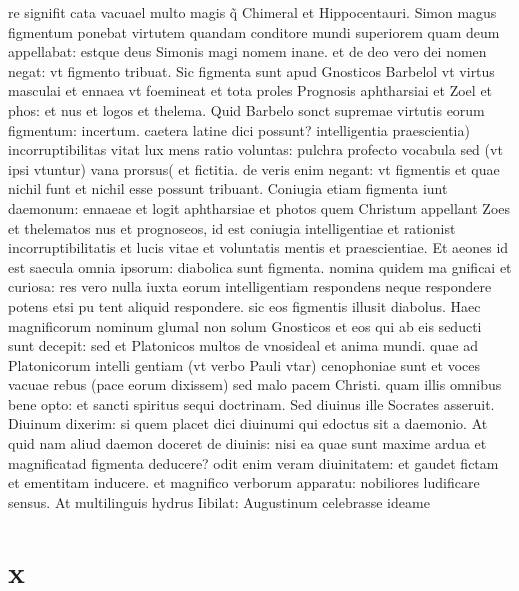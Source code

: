 \documentclass{article}
\begin{document}
\begin{pages}
re signifit cata vacuael multo magis q̃ Chimeral et Hippocentauri. Simon magus figmentum ponebat virtutem quandam conditore mundi superiorem quam deum appellabat: estque  deus Simonis magi nomem inane. et de deo vero dei nomen negat: vt figmento tribuat. Sic figmenta sunt apud Gnosticos Barbelol vt virtus masculai et ennaea vt foemineat et tota proles Prognosis aphtharsiai et Zoel et phos: et nus et logos et thelema. Quid Barbelo sonct supremae virtutis eorum figmentum: incertum. caetera latine dici possunt? intelligentia praescientia) incorruptibilitas vitat lux mens ratio voluntas: pulchra profecto vocabula sed (vt ipsi vtuntur) vana prorsus( et fictitia. de veris enim negant: vt figmentis et quae nichil funt et nichil esse possunt tribuant. Coniugia etiam figmenta iunt daemonum: ennaeae et logit aphtharsiae et photos quem Christum appellant Zoes et thelematos nus et prognoseos, id est coniugia intelligentiae et rationist incorruptibilitatis et lucis vitae et voluntatis mentis et praescientiae. Et aeones id est saecula omnia ipsorum: diabolica sunt figmenta. nomina quidem ma gnificai et curiosa: res vero nulla iuxta eorum intelligentiam respondens neque respondere potens etsi pu tent aliquid respondere. sic eos figmentis illusit diabolus. Haec magnificorum nominum glumal non solum Gnosticos et eos qui ab eis seducti sunt decepit: sed et Platonicos multos de vnosideal et anima mundi. quae ad Platonicorum intelli gentiam (vt verbo Pauli vtar) cenophoniae sunt et voces vacuae rebus (pace eorum dixissem) sed malo pacem Christi. quam illis omnibus bene opto: et sancti spiritus sequi doctrinam. Sed diuinus ille Socrates asseruit. Diuinum dixerim: si quem placet dici diuinumi qui edoctus sit a daemonio. At quid nam aliud daemon doceret de diuinis: nisi ea quae sunt maxime ardua et magnificatad figmenta deducere? odit enim veram diuinitatem: et gaudet fictam et ementitam inducere. et magnifico verborum apparatu: nobiliores ludificare sensus. At multilinguis hydrus Iibilat: Augustinum celebrasse ideame  \pend
\section*{x }

\end{pages}
\end{document}

